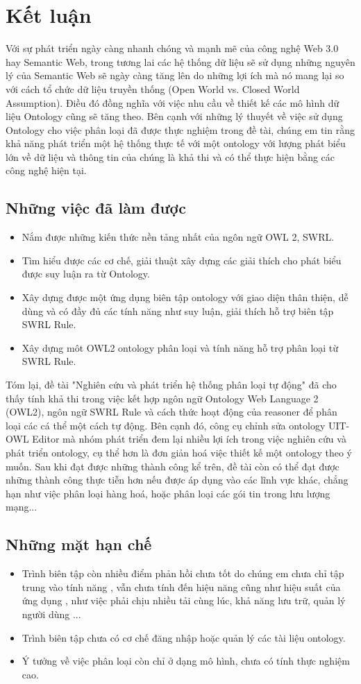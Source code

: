 \chapter{Kết luận}
Với sự phát triển ngày càng nhanh chóng và mạnh mẽ của công nghệ Web 3.0 hay Semantic Web, trong tương lai các hệ thống dữ liệu sẽ sử dụng những nguyên lý của Semantic Web sẽ ngày càng tăng lên do những lợi ích mà nó mang lại so với cách tổ chức dữ liệu truyền thống (Open World vs. Closed World Assumption). Điều đó đồng nghĩa với việc nhu cầu về thiết kế các mô hình dữ liệu Ontology cũng sẽ tăng theo. Bên cạnh với những lý thuyết về việc sử dụng Ontology cho việc phân loại đã được thực nghiệm trong đề tài, chúng em tin rằng khả năng phát triển một hệ thống thực tế với một ontology với lượng phát biểu lớn về dữ liệu và thông tin của chúng là khả thi và có thể thực hiện bằng các công nghệ hiện tại.
\section{Những việc đã làm được}
\begin{itemize}
\item Nắm được những kiến thức nền tảng nhất của ngôn ngữ OWL 2, SWRL.
\item Tìm hiểu được các cơ chế, giải thuật xây dựng các giải thích cho phát biểu được suy luận ra từ Ontology.
\item Xây dựng được một ứng dụng biên tập ontology với giao diện thân thiện, dễ dùng và có đầy đủ các tính năng như suy luận, giải thích hỗ trợ biên tập SWRL Rule.
\item Xây dựng môt OWL2 ontology phân loại và tính năng hỗ trợ phân loại từ SWRL Rule.
\end{itemize}
Tóm lại, đề tài "Nghiên cứu và phát triển hệ thống phân loại tự động" đã cho thấy tính khả thi trong việc kết hợp ngôn ngữ Ontology Web Language 2 (OWL2), ngôn ngữ SWRL Rule và cách thức hoạt động của reasoner để phân loại các cá thể một cách tự động. Bên cạnh đó, công cụ chỉnh sửa ontology UIT-OWL Editor mà nhóm phát triển đem lại nhiều lợi ích trong việc nghiên cứu và phát triển ontology, cụ thể hơn là đơn giản hoá việc thiết kế một ontology theo ý muốn. Sau khi đạt được những thành công kể trên, đề tài còn có thể đạt được những thành công thực tiễn hơn nếu được áp dụng vào các lĩnh vực khác, chẳng hạn như việc phân loại hàng hoá, hoặc phân loại các gói tin trong lưu lượng mạng...
\section{Những mặt hạn chế}
\begin{itemize}
\item Trình biên tập còn nhiều điểm phản hồi chưa tốt do chúng em chưa chỉ tập trung vào tính năng , vẫn chưa tính đến hiệu năng cũng như hiệu suất của ứng dụng , như việc phải chịu nhiều tải cùng lúc, khả năng lưu trữ, quản lý người dùng ...
\item Trình biên tập chưa có cơ chế đăng nhập hoặc quản lý các tài liệu ontology.
\item Ý tưởng về việc phân loại còn chỉ ở dạng mô hình, chưa có tính thực nghiệm cao.
\end{itemize}
